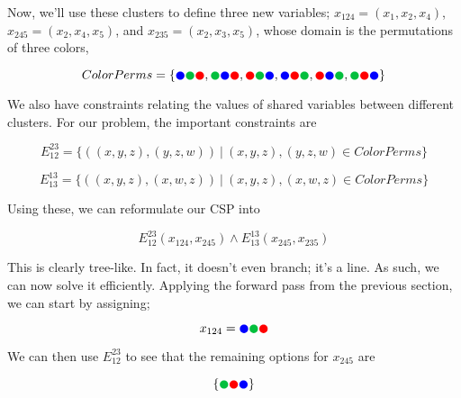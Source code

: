 Now, we'll use these clusters to define three new variables; $x_{124} = (x_1, x_2, x_4)$, $x_{245} = (x_2, x_4, x_5)$, and $x_{235} = (x_2, x_3, x_5)$, whose domain is the permutations of three colors,

\begin{equation}
    ColorPerms =
    \{{\color{blue}\CIRCLE} {\color{darkgreen}\CIRCLE} {\color{red}\CIRCLE}, 
    {\color{darkgreen}\CIRCLE} {\color{blue}\CIRCLE} {\color{red}\CIRCLE},
    {\color{red}\CIRCLE} {\color{darkgreen}\CIRCLE} {\color{blue}\CIRCLE},
    {\color{blue}\CIRCLE} {\color{red}\CIRCLE} {\color{darkgreen}\CIRCLE}, 
    {\color{red}\CIRCLE} {\color{blue}\CIRCLE} {\color{darkgreen}\CIRCLE},
    {\color{darkgreen}\CIRCLE} {\color{red}\CIRCLE} {\color{blue}\CIRCLE}
    \}
\end{equation}

We also have constraints relating the values of shared variables between different clusters. For our problem, the important constraints are

\begin{equation}
    E^{23}_{12} = \{((x, y, z), (y, z, w))\ |\ (x, y, z), (y, z, w) \in ColorPerms\}
\end{equation}

\begin{equation}
    E^{13}_{13} = \{((x, y, z), (x, w, z))\ |\ (x, y, z), (x, w, z) \in ColorPerms\}
\end{equation}

Using these, we can reformulate our CSP into

\begin{equation}
    E^{23}_{12}(x_{124}, x_{245}) \wedge E^{13}_{13}(x_{245}, x_{235})
\end{equation}

This is clearly tree-like. In fact, it doesn't even branch; it's a line. As such, we can now solve it efficiently. Applying the forward pass from the previous section, we can start by assigning;

\begin{equation}
    x_{124} = {\color{blue}\CIRCLE} {\color{darkgreen}\CIRCLE} {\color{red}\CIRCLE}
\end{equation}

We can then use $E^{23}_{12}$ to see that the remaining options for $x_{245}$ are

\begin{equation}
    \{{\color{darkgreen}\CIRCLE} {\color{red}\CIRCLE} {\color{blue}\CIRCLE}
    \}
\end{equation}

